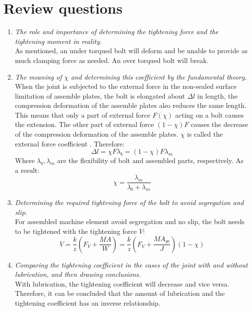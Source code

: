 \section{Review questions}
\begin{enumerate}
	\item \emph{The role and importance of determining the tightening force and the tightening	moment in reality.}\\
	As mentioned, an under torqued bolt will deform and be unable to provide as much clamping force as needed. An over torqued bolt will break.
	\item \emph{The meaning of $ \chi $ and determining this coefficient by the fundamental theory.}\\
	When the joint is subjected to the external force in the non-sealed surface limitation of assemble plates, the bolt is elongated about $ \Delta l $ in length, the compression deformation of the assemble plates also reduces the same length. This means that only a part of external force $ F(\chi) $ acting on a bolt causes the extension. The other part of external force $ (1-\chi)F $ causes the decrease of the compression deformation of the assemble plates. $ \chi $ is called the external force coefficient . Therefore:
	\[\Delta l = \chi F \lambda_b = (1-\chi)F\lambda_m\]
	Where $ \lambda_b, \lambda_m $ are the flexibility of bolt and assembled parts, respectively. As a result:
	\[\chi = \dfrac{\lambda_m}{\lambda_b+\lambda_m}\]
	\item \emph{Determining the required tightening force of the bolt to avoid segregation and slip.}\\
	For assembled machine element avoid segregation and no slip, the bolt needs to be tightened with the tightening force $ V $:
	\[V = \dfrac{k}{z}\left(F_V+\dfrac{MA}{W}\right) = \dfrac{k}{z}\left(F_V+\dfrac{MA_{yc}}{J}\right)(1-\chi)\]
	\item \emph{Comparing the tightening coefficient in the cases of the joint with and without lubrication, and then drawing conclusions.}\\
	With lubrication, the tightening coefficient will decrease and vice versa. Therefore, it can be concluded that the amount of lubrication and the tightening coefficient has an inverse relationship.
\end{enumerate}